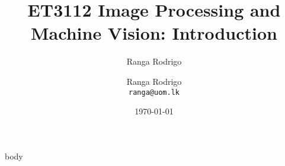 \documentclass[aspectratio=169,xcolor={svgnames}, 10pt]{beamer}
\title{ET3112 Image Processing and Machine Vision: Introduction}
\author{Ranga Rodrigo}
\author[]{Ranga Rodrigo\\ \texttt{ranga@uom.lk}}
\institute[]{The University of Moratuwa, Sri Lanka}
\date{\today}
\begin{document}
    \begin{frame}
        \titlepage
    \end{frame}


    {body}
\end{document}
